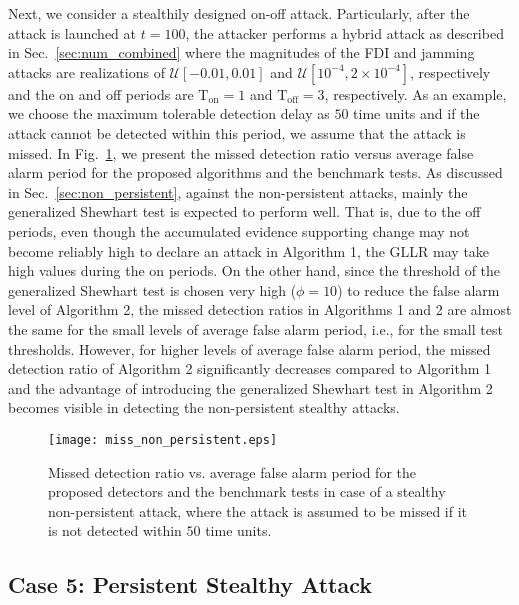 \documentclass[onecolumn]{IEEEtran}
\begin{document}
Next, we consider a stealthily designed on-off attack. Particularly, after the attack is launched at $t = 100$, the attacker performs a hybrid attack as described in Sec.~\ref{sec:num_combined} where the magnitudes of the FDI and jamming attacks are realizations of $\mathcal{U}[-0.01,0.01]$ and $\mathcal{U}[10^{-4},2\times10^{-4}]$, respectively and the on and off periods are $\mathrm{T}_{\text{on}} = 1$ and $\mathrm{T}_{\text{off}} = 3$, respectively. As an example, we choose the maximum tolerable detection delay as $50$ time units and if the attack cannot be detected within this period, we assume that the attack is missed. In Fig.~\ref{fig:miss_non_persistent}, we present the missed detection ratio versus average false alarm period for the proposed algorithms and the benchmark tests. As discussed in Sec.~\ref{sec:non_persistent}, against the non-persistent attacks, mainly the generalized Shewhart test is expected to perform well. That is, due to the off periods, even though the accumulated evidence supporting change may not become reliably high to declare an attack in Algorithm 1, the GLLR may take high values during the on periods. On the other hand, since the threshold of the generalized Shewhart test is chosen very high ($\phi = 10$) to reduce the false alarm level of Algorithm 2, the missed detection ratios in Algorithms 1 and 2 are almost the same for the small levels of average false alarm period, i.e., for the small test thresholds. However, for higher levels of average false alarm period, the missed detection ratio of Algorithm 2 significantly decreases compared to Algorithm 1 and the advantage of introducing the generalized Shewhart test in Algorithm 2 becomes visible in detecting the non-persistent stealthy attacks.

\begin{figure}
\center
  \texttt{[image: miss\_non\_persistent.eps]}
\caption{Missed detection ratio vs. average false alarm period for the proposed detectors and the benchmark tests in case of a stealthy non-persistent attack, where the attack is assumed to be missed if it is not detected within $50$ time units.}
 \label{fig:miss_non_persistent}
\end{figure}


\subsection{Case 5: Persistent Stealthy Attack} \label{sec:per_st}
\end{document}
